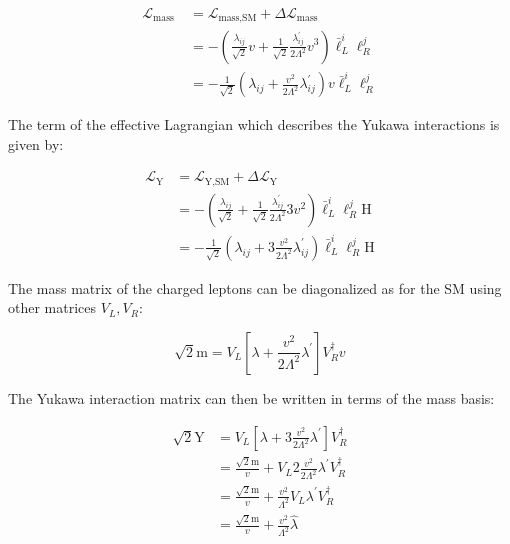 \begin{equation}
  \begin{aligned}
    \mathcal{L}_{\text {mass }} &=\mathcal{L}_{\text {mass}, \text{SM}}+\Delta \mathcal{L}_{\text {mass }} \\
    &=-(\frac{\lambda_{i j}}{\sqrt{2}} v+\frac{1}{\sqrt{2}} \frac{\lambda_{i j}^{\prime}}{2 \Lambda^2} v^{3}) \bar{\ell}_{L}^{i} \ell_{R}^{j} \\
    &=-\frac{1}{\sqrt{2}}(\lambda_{i j}+\frac{v^2}{2 \Lambda^2} \lambda_{i j}^{\prime}) v \bar{\ell}_{L}^{i} \ell_{R}^{j}
  \end{aligned}
\end{equation}

The term of the effective Lagrangian which describes the Yukawa interactions is given by:

\begin{equation}
  \begin{aligned}
    \mathcal{L}_{\text{Y}} &=\mathcal{L}_{\text{Y}, \text{SM}}+\Delta \mathcal{L}_{\text{Y}} \\
    &=-(\frac{\lambda_{i j}}{\sqrt{2}}+\frac{1}{\sqrt{2}} \frac{\lambda_{i j}^{\prime}}{2 \Lambda^2} 3 v^2) \bar{\ell}_{L}^{i} \ell_{R}^{j} \text{H} \\
    &=-\frac{1}{\sqrt{2}}(\lambda_{i j}+3 \frac{v^2}{2 \Lambda^2} \lambda_{i j}^{\prime}) \bar{\ell}_{L}^{i} \ell_{R}^{j} \text{H}
  \end{aligned}
\end{equation}

The mass matrix of the charged leptons can be diagonalized as for the SM using other matrices $V_{L}, V_{R}$:

\begin{equation}
  \sqrt{2} \text{m} = V_{L}[\lambda+\frac{v^2}{2 \Lambda^2} \lambda^{\prime}] V_{R}^{\dagger} v
\end{equation}

The Yukawa interaction matrix can then be written in terms of the mass basis:

\begin{equation}
  \begin{aligned}
    \sqrt{2} \text{Y} &=V_{L}[\lambda+3 \frac{v^2}{2 \Lambda^2} \lambda^{\prime}] V_{R}^{\dagger} \\
    &=\frac{\sqrt{2} \text{m}}{v}+V_{L} 2 \frac{v^2}{2 \Lambda^2} \lambda^{\prime} V_{R}^{\dagger} \\
    &=\frac{\sqrt{2} \text{m}}{v}+\frac{v^2}{\Lambda^2} V_{L} \lambda^{\prime} V_{R}^{\dagger} \\
    &=\frac{\sqrt{2} \text{m}}{v}+\frac{v^2}{\Lambda^2} \hat{\lambda}
  \end{aligned}
\end{equation}

